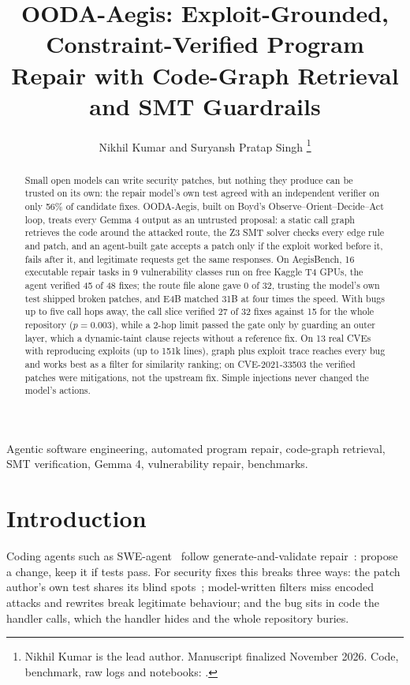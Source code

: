 \documentclass[journal]{IEEEtran}
\title{OODA-Aegis: Exploit-Grounded, Constraint-Verified Program Repair with Code-Graph Retrieval and SMT Guardrails}
\author{Nikhil Kumar and Suryansh Pratap Singh%
\thanks{Nikhil Kumar is the lead author. Manuscript finalized November 2026. Code, benchmark, raw logs and notebooks: \repolink{}.}}
\begin{document}
\maketitle

\begin{abstract}
Small open models can write security patches, but nothing they produce can be trusted on its own: the repair model's own test agreed with an independent verifier on only 56\% of candidate fixes. OODA-Aegis, built on Boyd's Observe--Orient--Decide--Act loop, treats every Gemma 4 output as an untrusted proposal: a static call graph retrieves the code around the attacked route, the Z3 SMT solver checks every edge rule and patch, and an agent-built gate accepts a patch only if the exploit worked before it, fails after it, and legitimate requests get the same responses. On AegisBench, 16 executable repair tasks in 9 vulnerability classes run on free Kaggle T4 GPUs, the agent verified 45 of 48 fixes; the route file alone gave 0 of 32, trusting the model's own test shipped broken patches, and E4B matched 31B at four times the speed. With bugs up to five call hops away, the call slice verified 27 of 32 fixes against 15 for the whole repository ($p = 0.003$), while a 2-hop limit passed the gate only by guarding an outer layer, which a dynamic-taint clause rejects without a reference fix. On 13 real CVEs with reproducing exploits (up to 151k lines), graph plus exploit trace reaches every bug and works best as a filter for similarity ranking; on CVE-2021-33503 the verified patches were mitigations, not the upstream fix. Simple injections never changed the model's actions.
\end{abstract}

\begin{IEEEkeywords}
Agentic software engineering, automated program repair, code-graph retrieval, SMT verification, Gemma 4, vulnerability repair, benchmarks.
\end{IEEEkeywords}

\section{Introduction}

Coding agents such as SWE-agent~\cite{sweagent} follow generate-and-validate repair~\cite{genprog,monperrus}: propose a change, keep it if tests pass. For security fixes this breaks three ways: the patch author's own test shares its blind spots~\cite{overfit}; model-written filters miss encoded attacks and rewrites break legitimate behaviour; and the bug sits in code the handler calls, which the handler hides and the whole repository buries.
\end{document}
